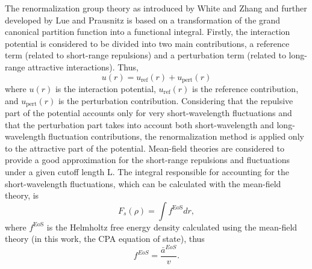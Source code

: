 \documentclass[preprint,12pt,3p]{elsarticle}
\begin{document}
The renormalization group theory as introduced by White and Zhang \cite{white1993renormalization} and further developed by Lue and Prausnitz \cite{lue1998renormalization,lue1998brenormalization} is based on a transformation of the grand canonical partition function into a functional integral.
Firstly, the interaction potential is considered to be divided into two main contributions, a reference term (related to short-range repulsions) and a perturbation term (related to long-range attractive interactions).
Thus,
\begin{equation} \label{eq:u(r)}
u(r) = u_\text{ref}(r) + u_\text{pert}(r)
\end{equation}
where $u(r)$ is the interaction potential, $u_\text{ref}(r)$ is the reference contribution, and $u_\text{pert}(r)$ is the perturbation contribution.
Considering that the repulsive part of the potential accounts only for very short-wavelength fluctuations and that the perturbation part takes into account both short-wavelength and long-wavelength fluctuation contributions, the renormalization method is applied only to the attractive part of the potential.
Mean-field theories are considered to provide a good approximation for the short-range repulsions and fluctuations under a given cutoff length L.
The integral responsible for accounting for the short-wavelength fluctuations, which can be calculated with the mean-field theory, is
\begin{equation} \label{eq:Fs}
F_{s}(\rho) = \int f^\text{EoS} dr,
\end{equation}
where $f^\text{EoS}$ is the Helmholtz free energy density calculated using the mean-field theory (in this work, the CPA equation of state), thus
\begin{equation} \label{eq:f_to_a}
f^{EoS} = \frac{\bar{a}^{EoS}}{v}.
\end{equation}
\end{document}
